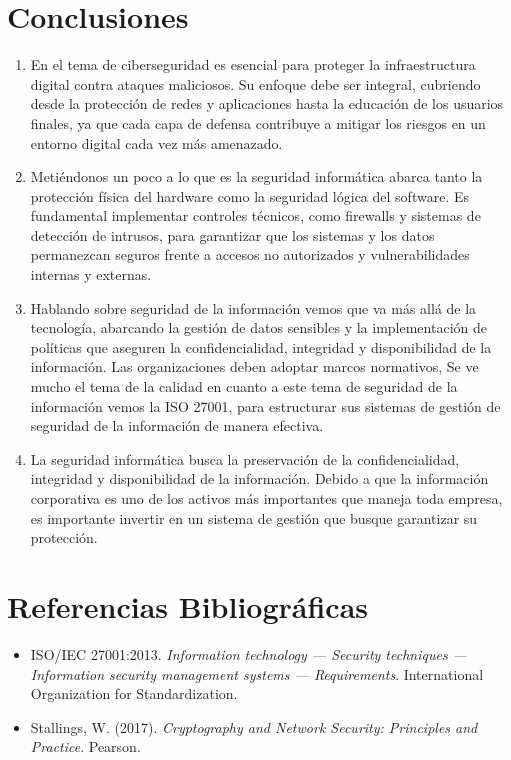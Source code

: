 \documentclass[12pt]{article}
\begin{document}
\section*{Conclusiones}
\begin{enumerate}
    \item En el tema de ciberseguridad es esencial para proteger la infraestructura digital contra ataques maliciosos. Su enfoque debe ser integral, cubriendo desde la protección de redes y aplicaciones hasta la educación de los usuarios finales, ya que cada capa de defensa contribuye a mitigar los riesgos en un entorno digital cada vez más amenazado.
    \item Metiéndonos un poco a lo que es la seguridad informática abarca tanto la protección física del hardware como la seguridad lógica del software. Es fundamental implementar controles técnicos, como firewalls y sistemas de detección de intrusos, para garantizar que los sistemas y los datos permanezcan seguros frente a accesos no autorizados y vulnerabilidades internas y externas.
    \item Hablando sobre seguridad de la información vemos que va más allá de la tecnología, abarcando la gestión de datos sensibles y la implementación de políticas que aseguren la confidencialidad, integridad y disponibilidad de la información. Las organizaciones deben adoptar marcos normativos, Se ve mucho el tema de la calidad en cuanto a este tema de seguridad de la información vemos la ISO 27001, para estructurar sus sistemas de gestión de seguridad de la información de manera efectiva.
    \item La seguridad informática busca la preservación de la confidencialidad, integridad y disponibilidad de la información. Debido a que la información corporativa es uno de los activos más importantes que maneja toda empresa, es importante invertir en un sistema de gestión que busque garantizar su protección.
\end{enumerate}

\section*{Referencias Bibliográficas}
\begin{itemize}
    \item ISO/IEC 27001:2013. \textit{Information technology — Security techniques — Information security management systems — Requirements}. International Organization for Standardization.
    \item Stallings, W. (2017). \textit{Cryptography and Network Security: Principles and Practice}. Pearson.
\end{itemize}
\end{document}
